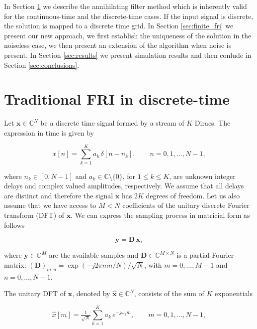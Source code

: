 \documentclass{article}
\def\x{{\bm x}}
\def\hx{\hat{x}}
\def\bhx{\bm{\hat{x}}}
\def\y{{\bm y}}
\def\D{{\bm D}}
\def\C{{\mathbb C}}
\begin{document}
In Section \ref{sec:annihil} we describe the annihilating filter method which is inherently valid for 
the continuous-time and the discrete-time cases. If the input signal is discrete, 
the solution is mapped to a discrete time grid. In Section \ref{sec:finite_fri} we present 
our new approach, we first establish the uniqueness of the solution in the noiseless case, 
we then present an extension of the algorithm when noise is present.
In Section \ref{sec:results} we present simulation results and then conlude
in Section \ref{sec:conclusions}.





\section{Traditional FRI in discrete-time}
\label{sec:annihil}

Let $\x \in \C^N$ be a discrete time signal formed by a stream of $K$ Diracs. 
The expression in time is given by

\begin{equation}
x[n] = \sum_{k=1}^K a_k \, \delta [n - n_k], \qquad n = 0, 1, \ldots, N-1,
\label{eq:sparse_x}
\end{equation}

\noindent
where $n_k \in [0,N-1]$ and $a_k \in \C \setminus \{0\}$, for $1 \leq k \leq K$,
are unknown integer delays and complex valued amplitudes, respectively. We assume that 
all delays are distinct and therefore the signal $\x$ has $2K$ degrees of freedom. 
Let us also assume that we have access to $M<N$ coefficients of the unitary discrete Fourier transform 
(DFT) of $\x$. We can express the sampling process in matricial form as follows

\begin{equation}
\y = \D \, \x,
\label{eq:under_y}
\end{equation}

\noindent 
where $\y \in \C^M$ are the available samples and $\D \in \C^{M \times N}$ is a partial Fourier matrix:
$\left( \D \right)_{m,n} = \exp \left(-j2\pi mn/N\right) / \sqrt{N}$,
with $m=0,\ldots,M-1$ and $n=0,\ldots,N-1$.

The unitary DFT of $\x$, denoted by $\bhx \in \C^N$, consists of the sum of $K$ exponentials

\begin{equation}
\hx[m] = \tfrac{1}{\sqrt{N}} \sum_{k=1}^K a_k \, e^{-j \omega_k m}, \qquad m = 0, 1, \ldots, N-1,
\label{eq:X_k}
\end{equation}
\end{document}
